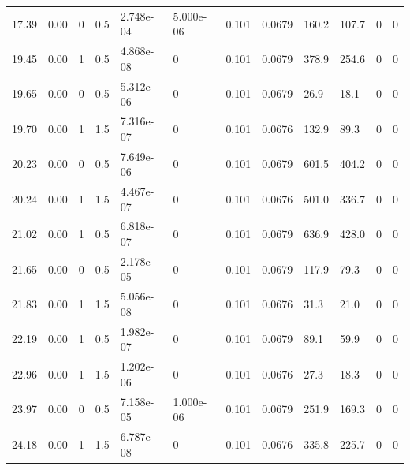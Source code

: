 \documentclass[preview]{standalone}
\begin{document}
{{\begin{tabular}{L{1.2cm}C{1.2cm} C{0.3cm}C{0.5cm} C{1.4cm}C{1.4cm} C{1.4cm}C{1.4cm} C{1.6cm}C{1.6cm} C{1.6cm}C{1.6cm}}
  17.39  &  0.00  & 0     & 0.5 &  2.748e-04  & 5.000e-06  &  0.101&   0.0679& 160.2 & 107.7   &  0 & 0  \\ 
  19.45  &  0.00  & 1     & 0.5 &  4.868e-08  & 0  &  0.101&   0.0679& 378.9 & 254.6   &  0 & 0  \\ 
  19.65  &  0.00  & 0     & 0.5 &  5.312e-06  & 0  &  0.101&   0.0679& 26.9 & 18.1   &  0 & 0  \\ 
  19.70  &  0.00  & 1     & 1.5 &  7.316e-07  & 0  &  0.101&   0.0676& 132.9 & 89.3   &  0 & 0  \\ 
  20.23  &  0.00  & 0     & 0.5 &  7.649e-06  & 0  &  0.101&   0.0679& 601.5 & 404.2   &  0 & 0  \\ 
  20.24  &  0.00  & 1     & 1.5 &  4.467e-07  & 0  &  0.101&   0.0676& 501.0 & 336.7   &  0 & 0  \\ 
  21.02  &  0.00  & 1     & 0.5 &  6.818e-07  & 0  &  0.101&   0.0679& 636.9 & 428.0   &  0 & 0  \\ 
  21.65  &  0.00  & 0     & 0.5 &  2.178e-05  & 0  &  0.101&   0.0679& 117.9 & 79.3   &  0 & 0  \\ 
  21.83  &  0.00  & 1     & 1.5 &  5.056e-08  & 0  &  0.101&   0.0676& 31.3 & 21.0   &  0 & 0  \\ 
  22.19  &  0.00  & 1     & 0.5 &  1.982e-07  & 0  &  0.101&   0.0679& 89.1 & 59.9   &  0 & 0  \\ 
  22.96  &  0.00  & 1     & 1.5 &  1.202e-06  & 0  &  0.101&   0.0676& 27.3 & 18.3   &  0 & 0  \\ 
  23.97  &  0.00  & 0     & 0.5 &  7.158e-05  & 1.000e-06  &  0.101&   0.0679& 251.9 & 169.3   &  0 & 0  \\ 
  24.18  &  0.00  & 1     & 1.5 &  6.787e-08  & 0  &  0.101&   0.0676& 335.8 & 225.7   &  0 & 0  \\ 
\hline 
\end{tabular} 

}}
\end{document}

